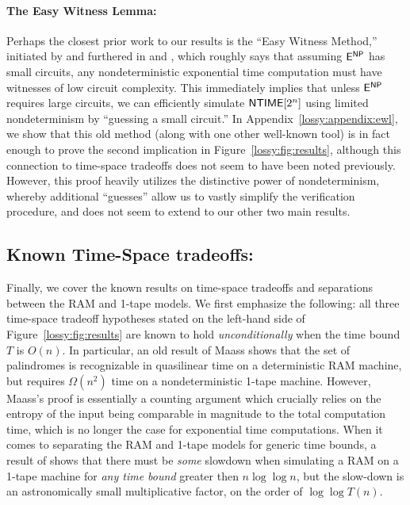 \paragraph{The Easy Witness Lemma:} Perhaps the closest prior work to our results is the ``Easy Witness Method,'' initiated by \cite{Kabenets} and furthered in \cite{IKW} and \cite{williams-sat}, which roughly says that assuming $\cl{E}^\cl{NP}$ has small circuits, any nondeterministic exponential time computation must have witnesses of low circuit complexity. This immediately implies that unless $\cl{E}^\cl{NP}$ requires large circuits, we can efficiently simulate $\cl{NTIME}[2^n]$ using limited nondeterminism by ``guessing a small circuit.'' In Appendix~\ref{lossy:appendix:ewl}, we show that this old method (along with one other well-known tool) is in fact enough to prove the second implication in Figure~\ref{lossy:fig:results}, although this connection to time-space tradeoffs does not seem to have been noted previously. However, this proof heavily utilizes the distinctive power of nondeterminism, whereby additional ``guesses'' allow us to vastly simplify the verification procedure, and does not seem to extend to our other two main results.

\subsection{Known Time-Space tradeoffs:}\label{lossy:subsec:known-tradeoffs}
Finally, we cover the known results on time-space tradeoffs and separations between the RAM and 1-tape models. We first emphasize the following: all three time-space tradeoff hypotheses stated on the left-hand side of Figure~\ref{lossy:fig:results} are known to hold \emph{unconditionally} when the time bound $T$ is $O(n)$. In particular, an old result of Maass \cite{palindromes} shows that the set of palindromes is recognizable in quasilinear time on a deterministic RAM machine, but requires $\Omega(n^2)$ time on a nondeterministic 1-tape machine. However, Maass's proof is essentially a counting argument which crucially relies on the entropy of the input being comparable in magnitude to the total computation time, which is no longer the case for exponential time computations. When it comes to separating the RAM and 1-tape models for generic time bounds, a result of \cite{robson} shows that there must be \emph{some} slowdown when simulating a RAM on a 1-tape machine for \emph{any time bound} greater then $n \log \log n$, but the slow-down is an astronomically small multiplicative factor, on the order of $\log \log T(n)$. 

